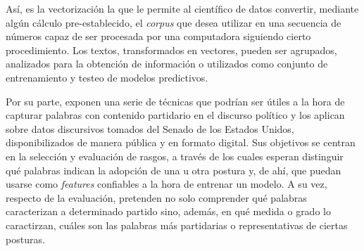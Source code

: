 \par
As\'i, es la vectorizaci\'on la que le permite al cient\'ifico de datos convertir,
mediante alg\'un c\'alculo pre-establecido, el \textit{corpus} que desea
utilizar en una secuencia de n\'umeros capaz de ser
procesada por una computadora siguiendo cierto procedimiento.
Los textos, transformados en vectores, pueden ser agrupados,
analizados para la obtenci\'on de informaci\'on o utilizados
como conjunto de entrenamiento y testeo de modelos predictivos.
\par
Por su parte, \cite{monroe2008fightin} exponen una serie de t\'ecnicas
que podr\'ian ser \'utiles a la hora de capturar palabras con contenido partidario
en el discurso pol\'itico y los aplican sobre datos discursivos tomados del Senado de
los Estados Unidos, disponibilizados de manera pública y en formato digital.
Sus objetivos se centran en la selecci\'on y evaluaci\'on de rasgos, a trav\'es
de los cuales esperan distinguir qu\'e palabras indican la adopci\'on de una u otra postura
y, de ah\'i, que puedan usarse como \textit{features} confiables a la hora de entrenar un
modelo. A su vez, respecto de la evaluaci\'on, pretenden no solo comprender qu\'e
palabras caracterizan a determinado partido sino, adem\'as, en qu\'e medida o grado
lo caractirzan, cu\'ales son las palabras m\'as partidarias o representativas de ciertas
posturas.
